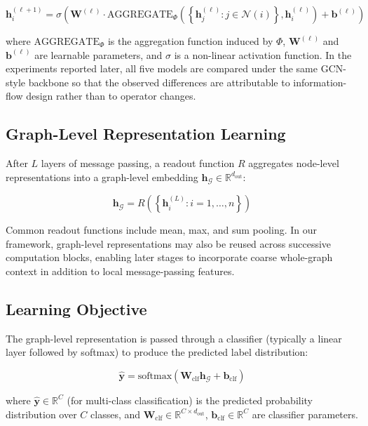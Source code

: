 \begin{equation}
\mathbf{h}_i^{(\ell+1)} = \sigma\left(\mathbf{W}^{(\ell)} \cdot \text{AGGREGATE}_{\Phi}\left(\left\{\mathbf{h}_j^{(\ell)} : j \in \mathcal{N}(i)\right\}, \mathbf{h}_i^{(\ell)}\right) + \mathbf{b}^{(\ell)}\right)
\end{equation}

where $\text{AGGREGATE}_{\Phi}$ is the aggregation function induced by $\Phi$, $\mathbf{W}^{(\ell)}$ and $\mathbf{b}^{(\ell)}$ are learnable parameters, and $\sigma$ is a non-linear activation function. In the experiments reported later, all five models are compared under the same GCN-style backbone so that the observed differences are attributable to information-flow design rather than to operator changes.

\subsection{Graph-Level Representation Learning}

After $L$ layers of message passing, a readout function $R$ aggregates node-level representations into a graph-level embedding $\mathbf{h}_{\mathcal{G}} \in \mathbb{R}^{d_{\text{out}}}$:

\begin{equation}
\mathbf{h}_{\mathcal{G}} = R\left(\left\{\mathbf{h}_i^{(L)} : i = 1, \ldots, n\right\}\right)
\end{equation}

Common readout functions include mean, max, and sum pooling. In our framework, graph-level representations may also be reused across successive computation blocks, enabling later stages to incorporate coarse whole-graph context in addition to local message-passing features.

\subsection{Learning Objective}

The graph-level representation is passed through a classifier (typically a linear layer followed by softmax) to produce the predicted label distribution:

\begin{equation}
\hat{\mathbf{y}} = \text{softmax}\left(\mathbf{W}_{\text{clf}} \mathbf{h}_{\mathcal{G}} + \mathbf{b}_{\text{clf}}\right)
\end{equation}

where $\hat{\mathbf{y}} \in \mathbb{R}^{C}$ (for multi-class classification) is the predicted probability distribution over $C$ classes, and $\mathbf{W}_{\text{clf}} \in \mathbb{R}^{C \times d_{\text{out}}}$, $\mathbf{b}_{\text{clf}} \in \mathbb{R}^{C}$ are classifier parameters.

